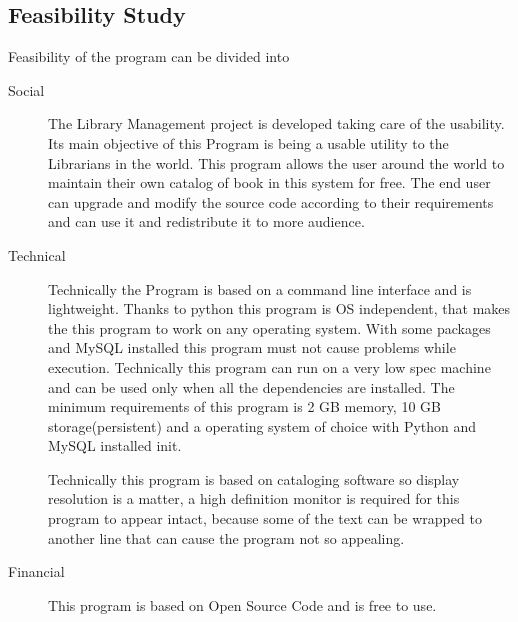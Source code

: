 \documentclass[12pt, a4paper, titlepage, openany]{report}
\begin{document}
\subsection{Feasibility Study}
Feasibility of the program can be divided into 
\begin{description}
\item[Social] The Library Management project is developed taking care of the usability. Its main objective of this Program is being a usable utility to the Librarians in the world. This program allows the user around the world to maintain their own catalog of book in this system for free. The end user can upgrade and modify the source code according to their requirements and can use it and redistribute it to more audience.
\item[Technical] Technically the Program is based on a command line interface and is lightweight. Thanks to python this program is OS independent, that makes the this program to work on any operating system. With some packages and MySQL installed this program must not cause problems while execution. Technically this program can run on a very low spec machine and can be used only when all the dependencies are installed. The minimum requirements of this program is 2 GB memory, 10 GB storage(persistent) and a operating system of choice with Python and MySQL installed init. 

Technically this program is based on cataloging software so display resolution is a matter, a high definition monitor is required for this program to appear intact, because some of the text can be wrapped to another line that can cause the program not so appealing.

\item[Financial] This program is based on Open Source Code and is free to use.

\end{description} 
\end{document}
